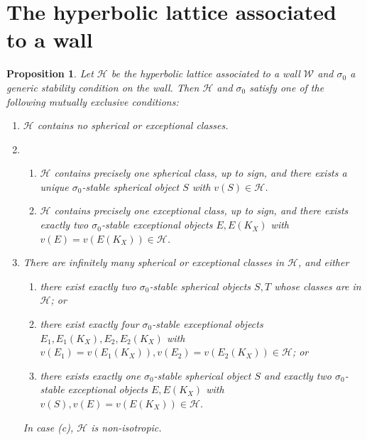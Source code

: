 \documentclass[leqno,11pt]{amsart}
\newtheorem{Prop}[Thm]{Proposition}
\theoremstyle{definition}
\def\HH{\ensuremath{\mathcal H}}
\def\WW{\ensuremath{\mathcal W}}
\begin{document}
\section{The hyperbolic lattice associated to a wall}
\begin{Prop}\label{Prop:lattice classification}Let $\HH$ be the hyperbolic lattice associated to a wall $\WW$ and $\sigma_0$ a generic stability condition on the wall.  Then $\HH$ and $\sigma_0$ satisfy one of the following mutually exclusive conditions:
\begin{enumerate}
\item $\HH$ contains no spherical or exceptional classes.  
\item \begin{enumerate}
	\item $\HH$ contains precisely one spherical class, up to sign, and there exists a unique $\sigma_0$-stable spherical object $S$ with $v(S)\in\HH$.
    \item $\HH$ contains precisely one exceptional class, up to sign, and there exists exactly two $\sigma_0$-stable exceptional objects $E,E(K_X)$ with $v(E)=v(E(K_X))\in\HH$.
    \end{enumerate}
\item There are infinitely many spherical or exceptional classes in $\HH$, and either 
\begin{enumerate}
\item there exist exactly two $\sigma_0$-stable spherical objects $S,T$ whose classes are in $\HH$; or
\item there exist exactly four $\sigma_0$-stable exceptional objects $E_1,E_1(K_X),E_2,E_2(K_X)$ with $v(E_1)=v(E_1(K_X)),v(E_2)=v(E_2(K_X))\in\HH$; or
\item there exists exactly one $\sigma_0$-stable spherical object $S$ and exactly two $\sigma_0$-stable exceptional objects $E,E(K_X)$ with $v(S),v(E)=v(E(K_X))\in\HH$.
\end{enumerate}
In case (c), $\HH$ is non-isotropic.
\end{enumerate}
\end{Prop}
\end{document}
